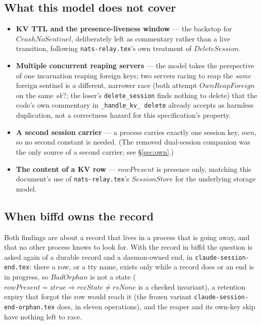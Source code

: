 \documentclass[a4paper,10pt,fleqn]{article}
\begin{document}
\subsection{What this model does not cover}

\begin{itemize}
  \item \textbf{KV TTL and the presence-liveness window} --- the
    backstop for $CrashNoSentinel$, deliberately left as commentary
    rather than a live transition, following \texttt{nats-relay.tex}'s
    own treatment of $DeleteSession$.
  \item \textbf{Multiple concurrent reaping servers} --- the model
    takes the perspective of one incarnation reaping foreign keys; two
    servers racing to reap the \emph{same} foreign sentinel is a
    different, narrower race (both attempt $OwnReapForeign$ on the same
    $sk?$; the loser's \texttt{delete\_session} finds nothing to
    delete) that the code's own commentary in \texttt{\_handle\_kv\_
    delete} already accepts as harmless duplication, not a correctness
    hazard for this specification's property.
  \item \textbf{A second session carrier} --- a process carries exactly
    one session key, $own$, so no second constant is needed.  (The removed
    dual-session companion was the only source of a second carrier;
    see \S\ref{sec:own}.)
  \item \textbf{The content of a KV row} --- $rowPresent$ is presence
    only, matching this document's use of \texttt{nats-relay.tex}'s
    $SessionStore$ for the underlying storage model.
\end{itemize}

\subsection{When biffd owns the record}

Both findings are about a record that lives in a process that is going away, and
that no other process knows to look for.  With the record in biffd the question
is asked again of a durable record and a daemon-owned end, in
\texttt{claude-session-end.tex}: there a row, or a tty name, exists only while a
record does or an end is in progress, so $BadOrphan$ is not a state
($rowPresent = ztrue \Rightarrow recState \neq rsNone$ is a checked invariant),
a retention expiry that forgot the row would reach it (the frozen variant
\texttt{claude-session-end-orphan.tex} does, in eleven operations), and the reaper
and its own-key skip have nothing left to race.
\end{document}
